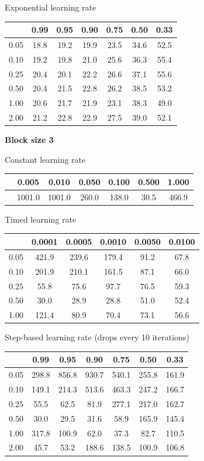 \documentclass[a4paper,14pt,oneside,openany]{memoir}
\begin{document}
	Exponential learning rate 
	
	\begin{tabular}{|c|c|c|c|c|c|c|}
	\hline 
	 &0.99 &0.95 &0.90 &0.75 &0.50 &0.33 \\
	 \hline 
	0.05 &18.8 &19.2 &19.9 &23.5 &34.6 &52.5 \\
	 \hline 
	0.10 &19.2 &19.8 &21.0 &25.6 &36.3 &55.4 \\
	 \hline 
	0.25 &20.4 &20.1 &22.2 &26.6 &37.1 &55.6 \\
	 \hline 
	0.50 &20.4 &21.5 &22.8 &26.2 &38.5 &53.2 \\
	 \hline 
	1.00 &20.6 &21.7 &21.9 &23.1 &38.3 &49.0 \\
	 \hline 
	2.00 &21.2 &22.8 &22.9 &27.5 &39.0 &52.1 \\
	 \hline 
	
	\end{tabular}
	
	\textbf{Block size 3}
	
	Constant learning rate 
	
	\begin{tabular}{|c|c|c|c|c|c|c|}
	\hline 
	 &0.005 &0.010 &0.050 &0.100 &0.500 &1.000 \\
	 \hline 
	 &1001.0 &1001.0 &260.0 &138.0 &30.5 &466.9 \\
	 \hline 
	
	\end{tabular}
	
	Timed learning rate 
	
	\begin{tabular}{|c|c|c|c|c|c|}
	\hline 
	 &0.0001 &0.0005 &0.0010 &0.0050 &0.0100 \\
	 \hline 
	0.05 &421.9 &239.6 &179.4 &91.2 &67.8 \\
	 \hline 
	0.10 &201.9 &210.1 &161.5 &87.1 &66.0 \\
	 \hline 
	0.25 &55.8 &75.6 &97.7 &76.5 &59.3 \\
	 \hline 
	0.50 &30.0 &28.9 &28.8 &51.0 &52.4 \\
	 \hline 
	1.00 &121.4 &80.9 &70.4 &73.1 &56.6 \\
	 \hline 
	
	\end{tabular}
	
	Step-based learning rate (drops every 10 iterations) 
	
	\begin{tabular}{|c|c|c|c|c|c|c|}
	\hline 
	 &0.99 &0.95 &0.90 &0.75 &0.50 &0.33 \\
	 \hline 
	0.05 &298.8 &856.8 &930.7 &540.1 &255.8 &161.9 \\
	 \hline 
	0.10 &149.1 &214.3 &513.6 &463.3 &247.2 &166.7 \\
	 \hline 
	0.25 &55.5 &62.5 &81.9 &277.1 &217.0 &162.7 \\
	 \hline 
	0.50 &30.0 &29.5 &31.6 &58.9 &165.9 &145.4 \\
	 \hline 
	1.00 &317.8 &100.9 &62.0 &37.3 &82.7 &110.5 \\
	 \hline 
	2.00 &45.7 &53.2 &188.6 &138.5 &100.9 &106.8 \\
	 \hline 
	
	\end{tabular}
	
\end{document}
